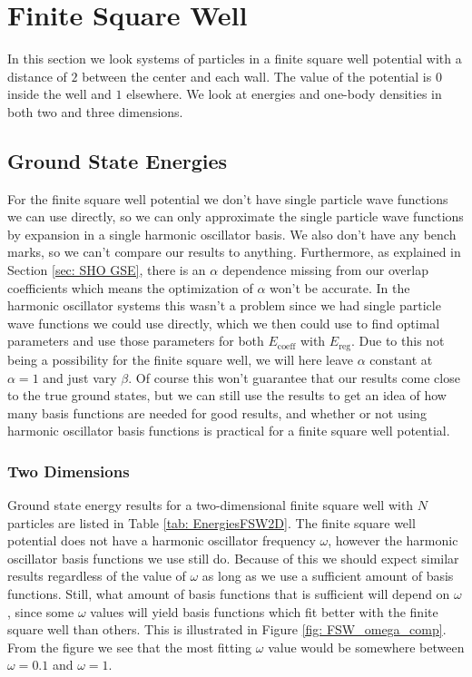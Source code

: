 \documentclass[../main.tex]{subfiles}
\begin{document}
\section{Finite Square Well}

In this section we look systems of particles in a finite square well potential with a distance of $2$ between the center and each wall. The value of the potential is $0$ inside the well and $1$ elsewhere. We look at energies and one-body densities in both two and three dimensions.

\subsection{Ground State Energies}

For the finite square well potential we don't have single particle wave functions we can use directly, so we can only approximate the single particle wave functions by expansion in a single harmonic oscillator basis. We also don't have any bench marks, so we can't compare our results to anything. Furthermore, as explained in Section \ref{sec: SHO GSE}, there is an $\alpha$ dependence missing from our overlap coefficients which means the optimization of $\alpha$ won't be accurate. In the harmonic oscillator systems this wasn't a problem since we had single particle wave functions we could use directly, which we then could use to find optimal parameters and use those parameters for both $E_\textrm{coeff}$ with $E_\textrm{reg}$. Due to this not being a possibility for the finite square well, we will here leave $\alpha$ constant at $\alpha = 1$ and just vary $\beta$. Of course this won't guarantee that our results come close to the true ground states, but we can still use the results to get an idea of how many basis functions are needed for good results, and whether or not using harmonic oscillator basis functions is practical for a finite square well potential.

\subsubsection{Two Dimensions}

Ground state energy results for a two-dimensional finite square well with $N$ particles are listed in Table \ref{tab: EnergiesFSW2D}. The finite square well potential does not have a harmonic oscillator frequency $\omega$, however the harmonic oscillator basis functions we use still do. Because of this we should expect similar results regardless of the value of $\omega$ as long as we use a sufficient amount of basis functions. Still, what amount of basis functions that is sufficient will depend on $\omega$, since some $\omega$ values will yield basis functions which fit better with the finite square well than others. This is illustrated in Figure \ref{fig: FSW_omega_comp}. From the figure we see that the most fitting $\omega$ value would be somewhere between $\omega = 0.1$ and $\omega = 1$.
\end{document}
